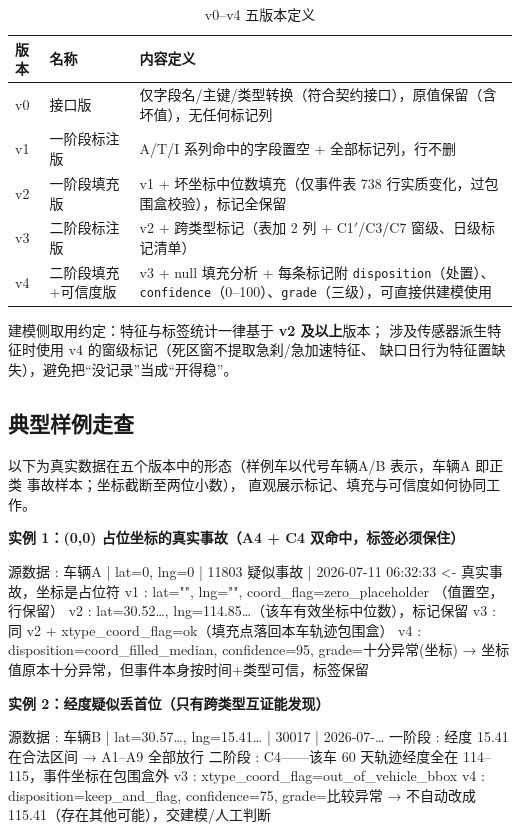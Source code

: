 \begin{table}[H]
\centering
\caption{v0--v4 五版本定义}
\label{tab:versions}
\small
\begin{tabularx}{\textwidth}{llL}
\toprule
版本 & 名称 & 内容定义 \\
\midrule
v0 & 接口版 & 仅字段名/主键/类型转换（符合契约接口），原值保留（含坏值），无任何标记列 \\
v1 & 一阶段标注版 & A/T/I 系列命中的字段置空 + 全部标记列，行不删 \\
v2 & 一阶段填充版 & v1 + 坏坐标中位数填充（仅事件表 738 行实质变化，过包围盒校验），标记全保留 \\
v3 & 二阶段标注版 & v2 + 跨类型标记（表加 2 列 + C1$'$/C3/C7 窗级、日级标记清单） \\
v4 & 二阶段填充+可信度版 & v3 + null 填充分析 + 每条标记附 \texttt{disposition}（处置）、\texttt{confidence}（0--100）、\texttt{grade}（三级），可直接供建模使用 \\
\bottomrule
\end{tabularx}
\end{table}

\noindent 建模侧取用约定：特征与标签统计一律基于 \textbf{v2 及以上}版本；
涉及传感器派生特征时使用 v4 的窗级标记（死区窗不提取急刹/急加速特征、
缺口日行为特征置缺失），避免把“没记录”当成“开得稳”。

\subsection{典型样例走查}

以下为真实数据在五个版本中的形态（样例车以代号车辆A/B 表示，车辆A 即正类
事故样本；坐标截断至两位小数），
直观展示标记、填充与可信度如何协同工作。

\noindent\textbf{实例 1：(0,0) 占位坐标的真实事故（A4 + C4 双命中，标签必须保住）}
\begin{databox}
源数据 : 车辆A | lat=0, lng=0 | 11803 疑似事故 | 2026-07-11 06:32:33  <- 真实事故，坐标是占位符
v1     : lat="", lng="", coord\_flag=zero\_placeholder           （值置空，行保留）
v2     : lat=30.52…, lng=114.85…（该车有效坐标中位数），标记保留
v3     : 同 v2 + xtype\_coord\_flag=ok（填充点落回本车轨迹包围盒）
v4     : disposition=coord\_filled\_median, confidence=95, grade=十分异常(坐标)
         → 坐标值原本十分异常，但事件本身按时间+类型可信，标签保留
\end{databox}

\noindent\textbf{实例 2：经度疑似丢首位（只有跨类型互证能发现）}
\begin{databox}
源数据 : 车辆B | lat=30.57…, lng=15.41… | 30017 | 2026-07-…
一阶段 : 经度 15.41 在合法区间 → A1–A9 全部放行
二阶段 : C4——该车 60 天轨迹经度全在 114–115，事件坐标在包围盒外
v3     : xtype\_coord\_flag=out\_of\_vehicle\_bbox
v4     : disposition=keep\_and\_flag, confidence=75, grade=比较异常
         → 不自动改成 115.41（存在其他可能），交建模/人工判断
\end{databox}

